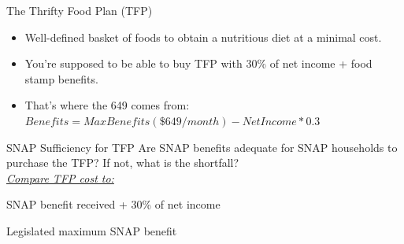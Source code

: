 \documentclass{beamer}
\begin{document}
\begin{frame}{The Thrifty Food Plan (TFP)}
  \setlength{\leftmargini}{1em}
\begin{itemize}
\item
Well-defined basket of foods to obtain a nutritious diet at a minimal cost.

\item
You're supposed to be able to buy TFP with 30\% of net income + food stamp benefits.

\item That's where the 649 comes from: $ Benefits=MaxBenefits(\$649/month)-NetIncome*0.3 $
\end{itemize}
\end{frame}





\begin{frame}{SNAP Sufficiency for TFP}
 \large{Are SNAP benefits adequate for SNAP households to purchase the TFP? If not, what is the shortfall?}\\
\vskip6pt \hspace{2mm} \normalsize{\underline{\textit{Compare TFP cost to:}}}
\begin{itemize}
{\item SNAP benefit received + 30\% of net income} 
{\item Legislated maximum SNAP benefit} 
\end{itemize}

\end{frame}
\end{document}
